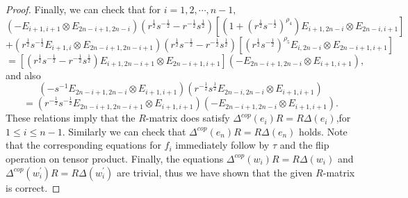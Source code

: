 \documentclass[10pt,a4paper]{amsart}
\numberwithin{equation}{section}
\begin{document}
\begin{proof}
 Finally, we can check that for $i=1,2, \cdots ,n-1,$
$$
\left(-E_{i+1, i+1} \otimes E_{2 n-i+1,2 n-i}\right)\left(r^{\frac{1}{2}} s^{-\frac{1}{2}}-r^{-\frac{1}{2}} s^{\frac{1}{2}}\right)\left[\left(1+\left(r^{\frac{1}{2}} s^{-\frac{1}{2}}\right)^{\rho_4}\right) E_{i+1,2 n-i} \otimes E_{2 n-i, i+1}\right]
$$
$$
+\left(r^{\frac{1}{2}} s^{-\frac{1}{2}} E_{i+1, i} \otimes E_{2 n-i+1,2 n-i+1}\right)\left(r^{\frac{1}{2}} s^{-\frac{1}{2}}-r^{-\frac{1}{2}} s^{\frac{1}{2}}\right)\left[\left(r^{\frac{1}{2}} s^{-\frac{1}{2}}\right)^{\rho_5} E_{i, 2 n-i} \otimes E_{2 n-i+1, i+1}\right]
$$
$$
=\left[\left(r^{\frac{1}{2}} s^{-\frac{1}{2}}-r^{-\frac{1}{2}} s^{\frac{1}{2}}\right) E_{i+1,2 n-i+1} \otimes E_{2 n-i+1, i+1}\right]\left(-E_{2 n-i+1,2 n-i} \otimes E_{i+1, i+1}\right),
$$
and also
$$
\left(-s^{-1} E_{2 n-i+1,2 n-i} \otimes E_{i+1, i+1}\right)\left(r^{-\frac{1}{2}} s^{\frac{1}{2}} E_{2 n-i, 2 n-i} \otimes E_{i+1, i+1}\right)
$$
$$
=\left(r^{-\frac{1}{2}} s^{-\frac{1}{2}} E_{2 n-i+1,2 n-i+1} \otimes E_{i+1, i+1}\right)\left(-E_{2 n-i+1,2 n-i} \otimes E_{i+1, i+1}\right).
$$
These relations  imply that the $R$-matrix does satisfy $\Delta^{c o p}\left(e_i\right) R=R \Delta\left(e_i\right)$,for $1\leq i\leq n-1$.
Similarly we can check that $
\Delta^{c o p}\left(e_n\right) R=R \Delta\left(e_n\right)$ holds.  Note that the corresponding equations for $f_i$ immediately follow
by $\tau$ and the flip operation on tensor product. Finally, the equations $\Delta^{c o p}\left(w_i\right) R=R \Delta\left(w_i\right)$ and $\Delta^{c o p}\left(w_i^{\prime}\right) R=R \Delta\left(w_i^{\prime}\right)$ are trivial, thus we have shown that the given $R$-matrix is correct.
\end{proof}
\end{document}
